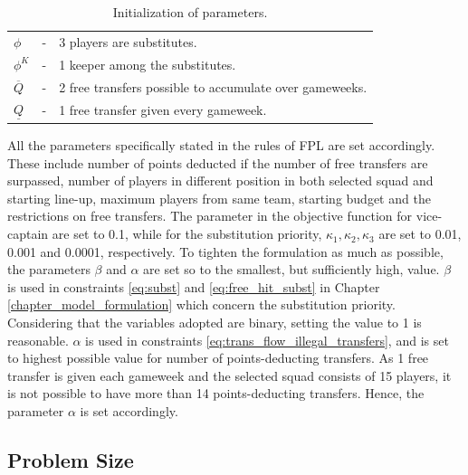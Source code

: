 \begin{table}[H]
\begin{tabular}{@{}lll@{}}
$\phi$                           & - & 3 players are substitutes.                                                         \\
$\phi^{K}$                       & - & 1 keeper among the substitutes.                                                          \\
$\overline{Q}$                   & - & 2 free transfers possible to accumulate over gameweeks.                                              \\
$\underline{Q}$                  & - & 1 free transfer given every gameweek.                                      \\ \bottomrule
\end{tabular}
\caption{Initialization of parameters.}
\label{tab:initialization_of_parameters}
\end{table}


All the parameters specifically stated in the rules of FPL are set accordingly. These include number of points deducted if the number of free transfers are surpassed, number of players in different position in both selected squad and starting line-up, maximum players from same team, starting budget and the restrictions on free transfers. The parameter in the objective function for vice-captain are set to 0.1, while for the substitution priority, $\kappa_{1}, \kappa_{2}, \kappa_{3}$ are set to 0.01, 0.001 and 0.0001, respectively. To tighten the formulation as much as possible, the parameters $\beta$ and $\alpha$ are set so to the smallest, but sufficiently high, value. $\beta$ is used in constraints \eqref{eq:subst} and \eqref{eq:free_hit_subst} in Chapter \ref{chapter_model_formulation} which concern the substitution priority. Considering that the variables adopted are binary, setting the value to 1 is reasonable. $\alpha$ is used in constraints \eqref{eq:trans_flow_illegal_transfers}, and is set to highest possible value for number of points-deducting transfers. As 1 free transfer is given each gameweek and the selected squad consists of 15 players, it is not possible to have more than 14 points-deducting transfers. Hence, the parameter $\alpha$ is set accordingly. 



\subsection{Problem Size}


